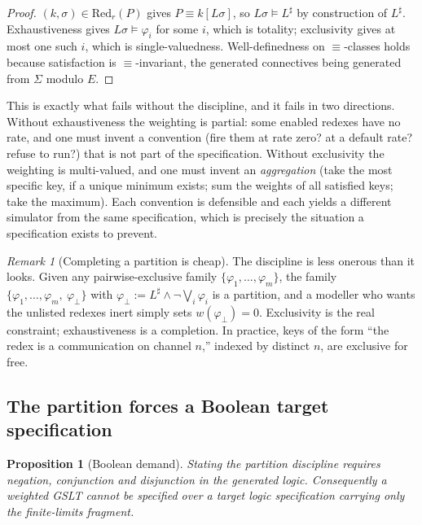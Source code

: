 \documentclass[11pt,a4paper]{article}
\theoremstyle{plain}
\newtheorem{proposition}[theorem]{Proposition}
\theoremstyle{definition}
\theoremstyle{remark}
\newtheorem{remark}[theorem]{Remark}
\newcommand{\Red}{\mathrm{Red}}
\newcommand{\wmap}{w}
\begin{document}
\begin{proof}
$(k,\sigma) \in \Red_r(P)$ gives $P \equiv k[L\sigma]$, so $L\sigma \models L^\sharp$ by
construction of $L^\sharp$. Exhaustiveness gives $L\sigma \models \varphi_i$ for some $i$, which is
totality; exclusivity gives at most one such $i$, which is single-valuedness. Well-definedness on
$\equiv$-classes holds because satisfaction is $\equiv$-invariant, the generated connectives being
generated from $\Sigma$ modulo $E$.
\end{proof}

This is exactly what fails without the discipline, and it fails in two directions. Without
exhaustiveness the weighting is partial: some enabled redexes have no rate, and one must invent a
convention (fire them at rate zero? at a default rate? refuse to run?) that is not part of the
specification. Without exclusivity the weighting is multi-valued, and one must invent an
\emph{aggregation} (take the most specific key, if a unique minimum exists; sum the weights of all
satisfied keys; take the maximum). Each convention is defensible and each yields a different
simulator from the same specification, which is precisely the situation a specification exists to
prevent.

\begin{remark}[Completing a partition is cheap]
\label{rem:default}
The discipline is less onerous than it looks. Given any pairwise-exclusive family
$\{\varphi_1,\dots,\varphi_m\}$, the family
$\{\varphi_1,\dots,\varphi_m,\ \varphi_\bot\}$ with
$\varphi_\bot := L^\sharp \wedge \neg\bigvee_i \varphi_i$ is a partition, and a modeller who wants
the unlisted redexes inert simply sets $\wmap(\varphi_\bot) = 0$. Exclusivity is the real
constraint; exhaustiveness is a completion. In practice, keys of the form ``the redex is a
communication on channel $n$,'' indexed by distinct $n$, are exclusive for free.
\end{remark}

\subsection{The partition forces a Boolean target specification}
\label{sec:boolean}

\begin{proposition}[Boolean demand]
\label{prop:boolean}
Stating the partition discipline requires negation, conjunction and disjunction in the generated
logic. Consequently a weighted GSLT cannot be specified over a target logic specification carrying
only the finite-limits fragment.
\end{proposition}
\end{document}
